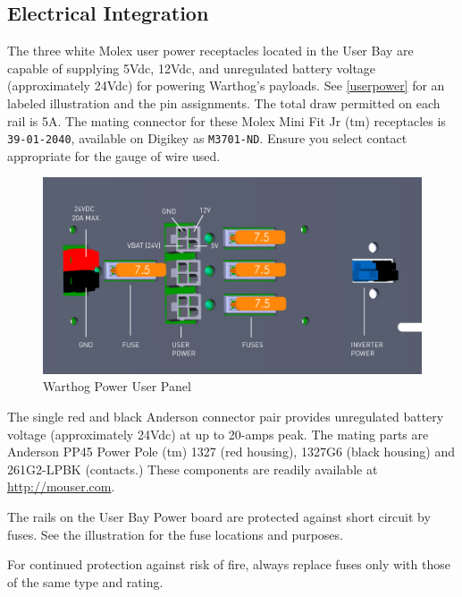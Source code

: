 \documentclass[]{clearpath-latex/clearpath-manual}
\begin{document}
\pagebreak[4]
\subsection{Electrical Integration}
\label{electrical}

The three white Molex user power receptacles located in the User Bay are capable of supplying 5Vdc, 12Vdc, and unregulated battery voltage (approximately 24Vdc) for powering Warthog's payloads. See \autoref{userpower} for an labeled illustration and the pin assignments. The total draw permitted on each rail is 5A. The mating connector for these Molex Mini Fit Jr (tm) receptacles is \lstinline{39-01-2040}, available on Digikey as \lstinline{M3701-ND}. Ensure you select contact appropriate for the gauge of wire used.

\begin{figure}[!h]
  \centering
  \includegraphics[width=1.0\linewidth]{Warthog_UserPower_SOLID.pdf}
  \caption{Warthog Power User Panel}
  \label{userpower}
\end{figure}

The single red and black Anderson connector pair provides unregulated battery voltage (approximately 24Vdc) at up to 20-amps peak. The mating parts are Anderson PP45 Power Pole (tm) 1327 (red housing), 1327G6 (black housing) and 261G2-LPBK (contacts.) These components are readily available at \url{http://mouser.com}.

The rails on the User Bay Power board are protected against short circuit by fuses. See the illustration for the fuse locations and purposes.

\begin{warning}
For continued protection against risk of fire, always replace fuses only with those of the same type and rating.
\end{warning}
\end{document}
